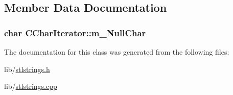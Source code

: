 \subsection{Member Data Documentation}
\hypertarget{classCCharIterator_ae7690621a79350973df240ef49f579cc}{
\subsubsection[{m\-\_\-\-Null\-Char}]{\setlength{\rightskip}{0pt plus 5cm}char C\-Char\-Iterator\-::m\-\_\-\-Null\-Char\hspace{0.3cm}{\ttfamily [protected]}}}\label{classCCharIterator_ae7690621a79350973df240ef49f579cc}


The documentation for this class was generated from the following files\-:\begin{DoxyCompactItemize}
\item 
lib/\hyperlink{stlstrings_8h}{stlstrings.\-h}\item 
lib/\hyperlink{stlstrings_8cpp}{stlstrings.\-cpp}\end{DoxyCompactItemize}
